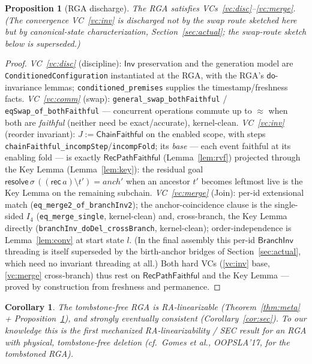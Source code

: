 \documentclass[11pt]{article}
\newtheorem{proposition}{Proposition}
\newtheorem{corollary}{Corollary}
\theoremstyle{definition}
\theoremstyle{remark}
\newcommand{\st}{\sigma}
\newcommand{\dodo}{\mathsf{do}}
\newcommand{\resolve}{\mathsf{resolve}}
\newcommand{\recList}{\mathsf{rec}}
\newcommand{\eqobs}{\approx}
\newcommand{\Inv}{\mathsf{Inv}}
\newcommand{\RVF}{\textsf{RecPathFaithful}}
\newcommand{\ChainFaithful}{\textsf{ChainFaithful}}
\newcommand{\lean}[1]{\texttt{#1}}
\begin{document}
\begin{proposition}[RGA discharge]\label{prop:discharge}
The RGA satisfies VCs~\ref{vc:disc}--\ref{vc:merge}. (The convergence VC~\ref{vc:inv} is
discharged not by the swap route sketched here but by canonical-state characterization,
Section~\ref{sec:actual}; the swap-route sketch below is superseded.)
\end{proposition}
\begin{proof}
\emph{VC~\ref{vc:disc}} (discipline): $\Inv$ preservation and the generation model are
\lean{ConditionedConfiguration} instantiated at the RGA, with the RGA's $\dodo$-invariance
lemmas; \lean{conditioned\_premises} supplies the timestamp/freshness facts.
\emph{VC~\ref{vc:comm}} (swap): \lean{general\_swap\_bothFaithful} /
\lean{eqSwap\_of\_bothFaithful} --- concurrent operations commute up to $\eqobs$ when both
are \emph{faithful} (neither need be exact/accurate), kernel-clean.
\emph{VC~\ref{vc:inv}} (reorder invariant): $J := \ChainFaithful$ on the enabled scope, with
steps \lean{chainFaithful\_incompStep}/\lean{incompFold}; its \emph{base} --- each event
faithful at its enabling fold --- is exactly $\RVF$ (Lemma~\ref{lem:rvf}) projected through
the Key Lemma (Lemma~\ref{lem:key}): the residual goal
$\resolve\,\st\,((\recList\,a)\setminus t') = anch'$ when an ancestor $t'$ becomes leftmost
live is the Key Lemma on the remaining subchain.
\emph{VC~\ref{vc:merge}} (Join): per-id extensional match
(\lean{eq\_merge2\_of\_branchInv2}); the anchor-coincidence clause is the single-sided
$I_4$ (\lean{eq\_merge\_single}, kernel-clean) and, cross-branch, the Key Lemma directly
(\lean{branchInv\_doDel\_crossBranch}, kernel-clean); order-independence is Lemma~\ref{lem:conv}
at start state $l$. (In the final assembly this per-id $\mathsf{BranchInv}$ threading is
itself superseded by the birth-anchor bridges of Section~\ref{sec:actual}, which need no
invariant threading at all.)
Both hard VCs (\ref{vc:inv} base, \ref{vc:merge} cross-branch) thus rest on $\RVF$ and the
Key Lemma --- proved by construction from freshness and permanence.
\end{proof}

\begin{corollary}
The tombstone-free RGA is RA-linearizable (Theorem~\ref{thm:meta} + Proposition~\ref{prop:discharge}),
and strongly eventually consistent (Corollary~\ref{cor:sec}). To our knowledge this is the
first mechanized RA-linearizability / SEC result for an RGA with physical, tombstone-free
deletion (cf.\ Gomes et al., OOPSLA'17, for the tombstoned RGA).
\end{corollary}
\end{document}
